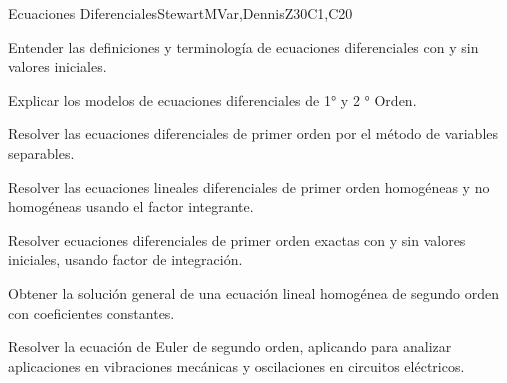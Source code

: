 \begin{syllabus}
\begin{unit}{Ecuaciones Diferenciales}{}{StewartMVar,DennisZ}{30}{C1,C20}
  \begin{learningoutcomes}
    \item Entender las definiciones y terminología de ecuaciones diferenciales con y sin valores iniciales.
    \item Explicar los modelos de ecuaciones diferenciales de 1° y 2 ° Orden.
    \item Resolver las ecuaciones diferenciales de primer orden por el método de variables separables.
    \item Resolver las ecuaciones lineales diferenciales de primer orden homogéneas y no homogéneas usando el factor integrante.
    \item Resolver ecuaciones diferenciales de primer orden exactas con y sin valores iniciales, usando factor de integración.
    \item Obtener la solución general de una ecuación lineal homogénea de segundo orden con coeficientes constantes.
    \item Resolver la ecuación de Euler de segundo orden, aplicando para analizar aplicaciones en vibraciones mecánicas y oscilaciones en circuitos eléctricos.
    \end{learningoutcomes}
\end{unit}

\begin{coursebibliography}
\end{coursebibliography}

\end{syllabus}
